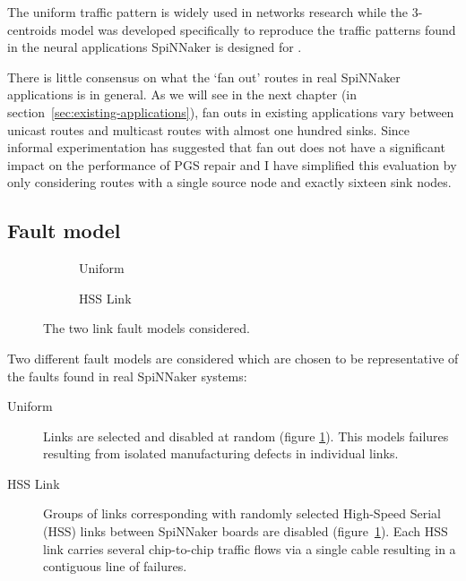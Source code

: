 			The uniform traffic pattern is widely used in networks research
			\cite{dally04,davies12} while the 3-centroids model was developed
			specifically to reproduce the traffic patterns found in the neural
			applications SpiNNaker is designed for \cite{navaridas14}.
			
			There is little consensus on what the `fan out' routes in real SpiNNaker
			applications is in general. As we will see in the next chapter (in
			section~\ref{sec:existing-applications}), fan outs in existing
			applications vary between unicast routes and multicast routes with almost
			one hundred sinks. Since informal experimentation has suggested that fan
			out does not have a significant impact on the performance of PGS repair
			and I have simplified this evaluation by only considering routes with a
			single source node and exactly sixteen sink nodes.
		
		\subsection{Fault model}
			
			\begin{figure}
				\center
				\begin{subfigure}{0.48\linewidth}
					\hspace*{-1.5cm}
					
					\caption{Uniform}
					\label{fig:fault-example-uniform}
				\end{subfigure}
				\begin{subfigure}{0.48\linewidth}
					\hspace*{-1.5cm}
					
					\caption{HSS Link}
					\label{fig:fault-example-hss}
				\end{subfigure}
				
				\caption{The two link fault models considered.}
				\label{fig:fault-example}
			\end{figure}
			
			Two different fault models are considered which are chosen to be
			representative of the faults found in real SpiNNaker systems:
			
			\begin{description}
				
				\item[Uniform] Links are selected and disabled at random (figure
				\ref{fig:fault-example-uniform}). This models failures resulting from
				isolated manufacturing defects in individual links.
				
				\item[HSS Link] Groups of links corresponding with randomly selected
				High-Speed Serial (HSS) links between SpiNNaker boards are disabled
				(figure~\ref{fig:fault-example-uniform}). Each HSS link carries several
				chip-to-chip traffic flows via a single cable resulting in a contiguous
				line of failures.
				
			\end{description}
			
